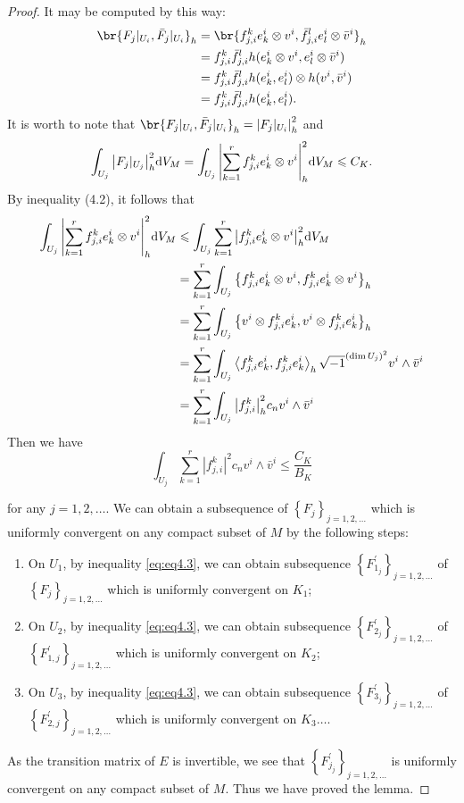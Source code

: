 \documentclass[twoside,openany,12pt]{beautynote}
\begin{document}
\begin{proof}
It may be computed by this way:
\begin{align*}
  \br{F_j|_{U_i},\bar{F}_j|_{U_i}}_h &= \br{f_{j, i}^k e_k^i \otimes v^i,\bar{f}_{j, i}^l e_l^i \otimes \bar{v}^i}_h\\ 
  &=f_{j, i}^k\bar{f}_{j, i}^l  h(e_k^i \otimes v^i, e_l^i \otimes \bar{v}^i)\\ 
  &=f_{j, i}^k\bar{f}_{j, i}^l  h(e_k^i , e_l^i )\otimes h(v^i,\bar{v}^i)\\ 
  &=f_{j, i}^k\bar{f}_{j, i}^l  h(e_k^i , e_l^i ).
\end{align*}
  It is worth to note that $\br{F_j|_{U_i},\bar{F}_j|_{U_i}}_h=\abs{F_j|_{U_i}}^2_h$ and \[
    \int_{U_j} \abs{F_{j}|_{U_j}}_h^2 \dd V_M =\int_{U_j} \abs{\sum_{k=1}^r f_{j,i}^k e_k^i \otimes v^i}_h^2 \dd V_M \leqslant C_K.  \]
By inequality (4.2), it follows that
\begin{align*}
  \int_{U_j} \abs{\sum_{k=1}^r f_{j,i}^k e_k^i \otimes v^i}_h^2 \dd V_M &\leqslant\int_{U_j} \sum_{k=1}^r \abs{f_{j,i}^k e_k^i \otimes v^i}_h^2 \dd V_M \\
  &=\sum_{k=1}^r\int_{U_j} \left\{f_{j,i}^k e_k^i \otimes v^i,f_{j,i}^k e_k^i \otimes v^i\right\}_h\\ 
  &=\sum_{k=1}^r\int_{U_j} \left\{ v^i \otimes f_{j,i}^k e_k^i,v^i \otimes f_{j,i}^k e_k^i\right\}_h\\
&=\sum_{k=1}^r\int_{U_j} \left\langle f_{j,i}^k e_k^i,f_{j,i}^k e_k^i\right\rangle_h \sqrt{-1}^{(\dim U_j)^2} v^i\wedge \bar{v}^i\\ 
&=\sum_{k=1}^r\int_{U_j} \abs{f_{j,i}^k}^2_h c_n v^i\wedge \bar{v}^i
\end{align*}
  Then we have
\begin{equation}
  \label{eq:eq4.3}
  \int_{U_j} \sum_{k=1}^r\left|f_{j, i}^k\right|^2 c_n v^i \wedge \bar{v}^i \leq \frac{C_K}{B_K}
\end{equation}
  
for any $j=1,2, \ldots$.
We can obtain a subsequence of $\left\{F_j\right\}_{j=1,2, \ldots}$ which is uniformly convergent on any compact subset of $M$ by the following steps:
\begin{enumerate}[label=(\arabic*)]
  \item On $U_1$, by inequality \eqref{eq:eq4.3}, we can obtain subsequence $\left\{F_{1_j}^{\prime}\right\}_{j=1,2, \ldots}$ of $\left\{F_j\right\}_{j=1,2, \ldots}$ which is uniformly convergent on $K_1$;
  \item On $U_2$, by inequality \eqref{eq:eq4.3}, we can obtain subsequence $\left\{F_{2_j}^{\prime}\right\}_{j=1,2, \ldots}$ of $\left\{F_{1, j}^{\prime}\right\}_{j=1,2, \ldots}$ which is uniformly convergent on $K_2$;
  \item On $U_3$, by inequality \eqref{eq:eq4.3}, we can obtain subsequence $\left\{F_{3_j}^{\prime}\right\}_{j=1,2, \ldots}$ of $\left\{F_{2, j}^{\prime}\right\}_{j=1,2, \ldots}$ which is uniformly convergent on $K_3 \ldots$.
\end{enumerate}

As the transition matrix of $E$ is invertible, we see that $\left\{F_{j_j}^{\prime}\right\}_{j=1,2, \ldots}$ is uniformly convergent on any compact subset of $M$. Thus we have proved the lemma.
\end{proof}
\end{document}
